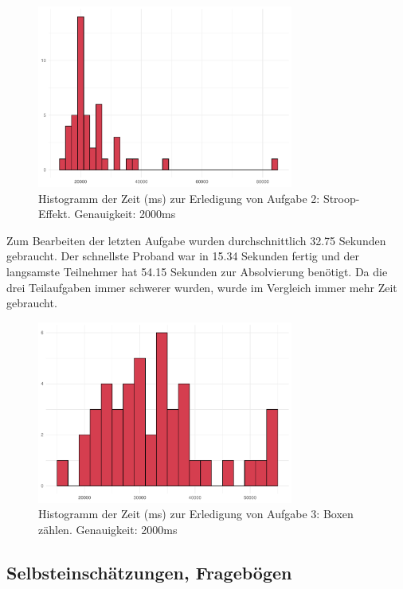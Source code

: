 \begin{figure}[H]
	\centering
	\includegraphics[width=0.75\textwidth]{./_StudyResults/matchingTimeHist}
	\caption{Histogramm der Zeit (ms) zur Erledigung von Aufgabe 2: Stroop-Effekt. Genauigkeit: 2000ms}
	\label{fig:matchingTimeHistogram}
\end{figure}

Zum Bearbeiten der letzten Aufgabe wurden durchschnittlich 32.75 Sekunden gebraucht. Der schnellste Proband war in 15.34 Sekunden fertig und der langsamste Teilnehmer hat 54.15 Sekunden zur Absolvierung benötigt. Da die drei Teilaufgaben immer schwerer wurden, wurde im Vergleich immer mehr Zeit gebraucht.
\begin{figure}[H]
	\centering
	\includegraphics[width=0.75\textwidth]{./_StudyResults/countingTimeHist}
	\caption{Histogramm der Zeit (ms) zur Erledigung von Aufgabe 3: Boxen zählen. Genauigkeit: 2000ms}
	\label{fig:countingTimeHistogram}
\end{figure}


\subsection{Selbsteinschätzungen, Fragebögen}

